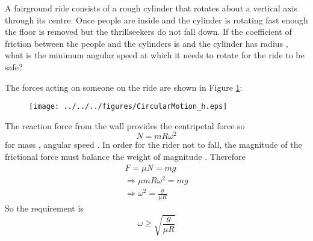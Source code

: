 
\begin{problem}
{A fairground ride consists of a rough cylinder that rotates about a vertical axis through its centre. Once people are inside and the cylinder is rotating fast enough the floor is removed but the thrillseekers do not fall down. If the coefficient of friction between the people and the cylinders is \vari{\mu} and the cylinder has radius , what is the minimum angular speed at which it needs to rotate for the ride to be safe?
}
{}
{The forces acting on someone on the ride are shown in Figure \ref{fig:CircularMotion_h}:
\begin{figure}[h]
\centering
\texttt{[image: ../../../figures/CircularMotion\_h.eps]}
\caption{}
\label{fig:CircularMotion_h}
\end{figure}
The reaction force  from the wall provides the centripetal force so
\begin{equation*}
N=mR\omega^2
\end{equation*}
for mass , angular speed \vari{\omega}. In order for the rider not to fall, the magnitude of the frictional force \value{F}{\mu N}{} must balance the weight of magnitude . Therefore
\begin{align*}
F=\mu N=mg \\
\Rightarrow \mu mR\omega^2=mg \\
\Rightarrow \omega^2=\frac{g}{\mu R}
\end{align*}
So the requirement is 
\begin{equation*}
\omega\ge\sqrt{\frac{g}{\mu R}}
\end{equation*}
}
\end{problem}